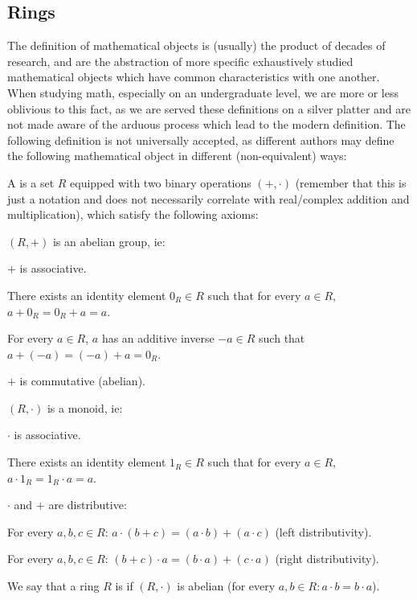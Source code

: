 \documentclass[10pt]{article}
\begin{document}


\bigskip

\subsection{Rings}

The definition of mathematical objects is (usually) the product of decades of research, and are the abstraction of more specific exhaustively studied mathematical objects which have common characteristics
with one another.
When studying math, especially on an undergraduate level, we are more or less oblivious to this fact, as we are served these definitions on a silver platter and are not made aware of the arduous process
which lead to the modern definition.
The following definition is not universally accepted, as different authors may define the following mathematical object in different (non-equivalent) ways:

\begin{defn*}

    A  is a set $R$ equipped with two binary operations $(+, \cdot)$ (remember that this is just a notation and does not necessarily correlate with real/complex addition and multiplication), 
    which satisfy the following axioms:
    \benum
        \item $(R, +)$ is an abelian group, ie:
        \benum
            \item $+$ is associative.
            \item There exists an identity element $0_R\in R$ such that for every $a\in R$, $a+0_R=0_R+a=a$.
            \item For every $a\in R$, $a$ has an additive inverse $-a\in R$ such that $a+(-a)=(-a)+a=0_R$.
            \item $+$ is commutative (abelian).
        \eenum
        \item $(R, \cdot)$ is a monoid, ie:
        \benum
            \item $\cdot$ is associative.
            \item There exists an identity element $1_R\in R$ such that for every $a\in R$, $a\cdot 1_R=1_R\cdot a=a$.
        \eenum
        \item $\cdot$ and $+$ are distributive:
        \benum
            \item For every $a,b,c\in R$: $a\cdot(b+c)=(a\cdot b) + (a\cdot c)$ (left distributivity).
            \item For every $a,b,c\in R$: $(b+c)\cdot a=(b\cdot a) + (c\cdot a)$ (right distributivity).
        \eenum
    \eenum

    We say that a ring $R$ is  if $(R,\cdot)$ is abelian (for every $a,b\in R: a\cdot b=b\cdot a$).

\end{defn*}
\end{document}
